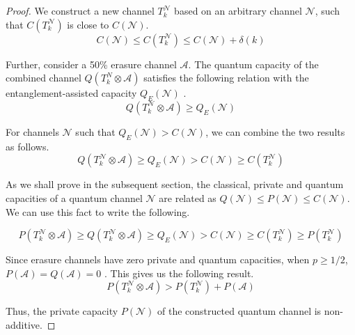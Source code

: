\begin{proof}
We construct a new channel $T_k^\mathcal{N}$ based on an arbitrary channel $\mathcal{N}$, such that $C(T_k^\mathcal{N})$ is close to $C(\mathcal{N})$.
$$C(\mathcal{N}) \leq C(T_k^\mathcal{N}) \leq C(\mathcal{N}) + \delta(k)$$

Further, consider a 50\% erasure channel $\mathcal{A}$. The quantum capacity of the combined channel $Q(T_k^N \otimes \mathcal{A})$ satisfies the following relation with the entanglement-assisted capacity $Q_E(\mathcal{N})$ \cite{PhysRevLett.83.3081}.
$$Q(T_k^\mathcal{N} \otimes \mathcal{A}) \geq Q_E(\mathcal{N})$$

For channels $\mathcal{N}$ such that $Q_E(\mathcal{N}) > C(\mathcal{N})$, we can combine the two results as follows.
$$Q(T_k^\mathcal{N} \otimes \mathcal{A}) \geq Q_E(\mathcal{N}) > C(\mathcal{N}) \geq C(T_k^\mathcal{N})$$

As we shall prove in the subsequent section, the classical, private and quantum capacities of a quantum channel $\mathcal{N}$ are related as $Q(\mathcal{N}) \leq P(\mathcal{N}) \leq C(\mathcal{N})$. We can use this fact to write the following.

$$P(T_k^\mathcal{N} \otimes \mathcal{A}) \geq Q(T_k^\mathcal{N} \otimes \mathcal{A}) \geq Q_E(\mathcal{N}) > C(\mathcal{N}) \geq C(T_k^\mathcal{N}) \geq P(T_k^\mathcal{N})$$

Since erasure channels have zero private and quantum capacities, when $p \geq 1/2$, $P(\mathcal{A}) = Q(\mathcal{A}) = 0$ \cite{PhysRevLett.78.3217}. This gives us the following result.
$$P(T_k^\mathcal{N} \otimes \mathcal{A}) > P(T_k^\mathcal{N}) + P(\mathcal{A})$$

Thus, the private capacity $P(\mathcal{N})$ of the constructed quantum channel is non-additive.
\end{proof}
